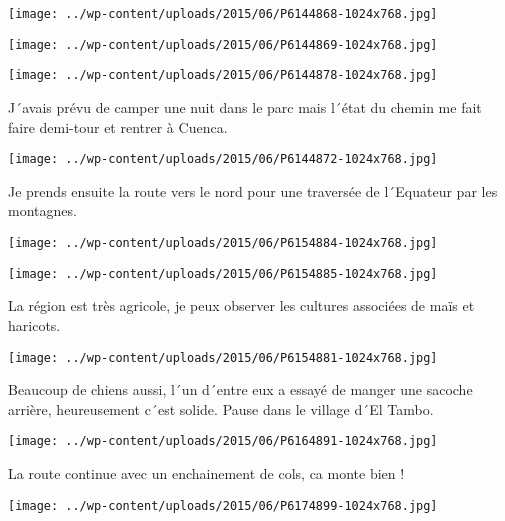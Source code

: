  \newline
 \newline
\centerline{\texttt{[image: ../wp-content/uploads/2015/06/P6144868-1024x768.jpg]} } 
 \newline
 \newline
\centerline{\texttt{[image: ../wp-content/uploads/2015/06/P6144869-1024x768.jpg]} } 
 \newline
 \newline
\centerline{\texttt{[image: ../wp-content/uploads/2015/06/P6144878-1024x768.jpg]} } 
 \newline
 J´avais prévu de camper une nuit dans le parc mais l´état du chemin me fait faire demi-tour et rentrer à Cuenca. \newline
 \newline
\centerline{\texttt{[image: ../wp-content/uploads/2015/06/P6144872-1024x768.jpg]} } 
 \newline
 Je prends ensuite la route vers le nord pour une traversée de l´Equateur par les montagnes. \newline
 \newline
\centerline{\texttt{[image: ../wp-content/uploads/2015/06/P6154884-1024x768.jpg]} } 
 \newline
 \newline
\centerline{\texttt{[image: ../wp-content/uploads/2015/06/P6154885-1024x768.jpg]} } 
 \newline
 La région est très agricole, je peux observer les cultures associées de maïs et haricots. \newline
 \newline
\centerline{\texttt{[image: ../wp-content/uploads/2015/06/P6154881-1024x768.jpg]} } 
 \newline
 Beaucoup de chiens aussi, l´un d´entre eux a essayé de manger une sacoche arrière, heureusement c´est solide. \newline
 Pause dans le village d´El Tambo. \newline
 \newline
\centerline{\texttt{[image: ../wp-content/uploads/2015/06/P6164891-1024x768.jpg]} } 
 \newline
 La route continue avec un enchainement de cols, ca monte bien ! \newline
 \newline
\centerline{\texttt{[image: ../wp-content/uploads/2015/06/P6174899-1024x768.jpg]} } 
 \newline
